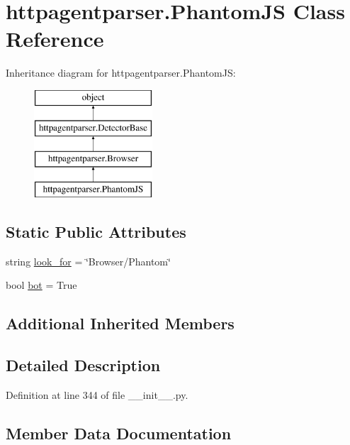 \hypertarget{classhttpagentparser_1_1_phantom_j_s}{}\section{httpagentparser.\+Phantom\+JS Class Reference}
\label{classhttpagentparser_1_1_phantom_j_s}
Inheritance diagram for httpagentparser.\+Phantom\+JS\+:\begin{figure}[H]
\begin{center}
\leavevmode
\includegraphics[height=4.000000cm]{classhttpagentparser_1_1_phantom_j_s}
\end{center}
\end{figure}
\subsection*{Static Public Attributes}
\begin{DoxyCompactItemize}
\item 
string \hyperlink{classhttpagentparser_1_1_phantom_j_s_a936017178cad2cf0575e77f2599002cf}{look\+\_\+for} = \char`\"{}Browser/Phantom\char`\"{}
\item 
bool \hyperlink{classhttpagentparser_1_1_phantom_j_s_a08929340201fcdd0c58f0baac107ed5d}{bot} = True
\end{DoxyCompactItemize}
\subsection*{Additional Inherited Members}


\subsection{Detailed Description}


Definition at line 344 of file \+\_\+\+\_\+init\+\_\+\+\_\+.\+py.



\subsection{Member Data Documentation}
\hypertarget{classhttpagentparser_1_1_phantom_j_s_a08929340201fcdd0c58f0baac107ed5d}{}\label{classhttpagentparser_1_1_phantom_j_s_a08929340201fcdd0c58f0baac107ed5d} 
